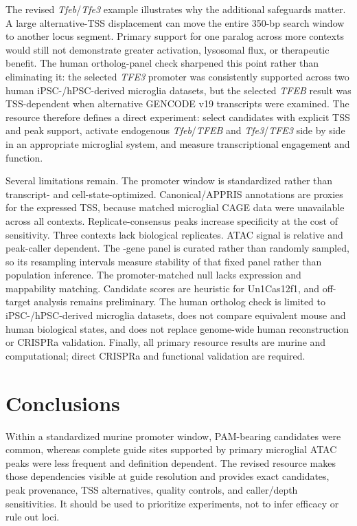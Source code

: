 \documentclass[11pt]{article}
\begin{document}
The revised \textit{Tfeb}/\textit{Tfe3} example illustrates why the additional safeguards matter. A large alternative-TSS displacement can move the entire 350-bp search window to another locus segment. Primary support for one paralog across more contexts would still not demonstrate greater activation, lysosomal flux, or therapeutic benefit. The human ortholog-panel check sharpened this point rather than eliminating it: the selected \textit{TFE3} promoter was consistently supported across two human iPSC-/hPSC-derived microglia datasets, but the selected \textit{TFEB} result was TSS-dependent when alternative GENCODE v19 transcripts were examined. The resource therefore defines a direct experiment: select candidates with explicit TSS and peak support, activate endogenous \textit{Tfeb}/\textit{TFEB} and \textit{Tfe3}/\textit{TFE3} side by side in an appropriate microglial system, and measure transcriptional engagement and function.

Several limitations remain. The promoter window is standardized rather than transcript- and cell-state-optimized. Canonical/APPRIS annotations are proxies for the expressed TSS, because matched microglial CAGE data were unavailable across all contexts. Replicate-consensus peaks increase specificity at the cost of sensitivity. Three contexts lack biological replicates. ATAC signal is relative and peak-caller dependent. The \NPanel{}-gene panel is curated rather than randomly sampled, so its resampling intervals measure stability of that fixed panel rather than population inference. The promoter-matched null lacks expression and mappability matching. Candidate scores are heuristic for Un1Cas12f1, and off-target analysis remains preliminary. The human ortholog check is limited to iPSC-/hPSC-derived microglia datasets, does not compare equivalent mouse and human biological states, and does not replace genome-wide human reconstruction or CRISPRa validation. Finally, all primary resource results are murine and computational; direct CRISPRa and functional validation are required.

\section{Conclusions}

Within a standardized murine promoter window, PAM-bearing candidates were common, whereas complete guide sites supported by primary microglial ATAC peaks were less frequent and definition dependent. The revised resource makes those dependencies visible at guide resolution and provides exact candidates, peak provenance, TSS alternatives, quality controls, and caller/depth sensitivities. It should be used to prioritize experiments, not to infer efficacy or rule out loci.
\end{document}
